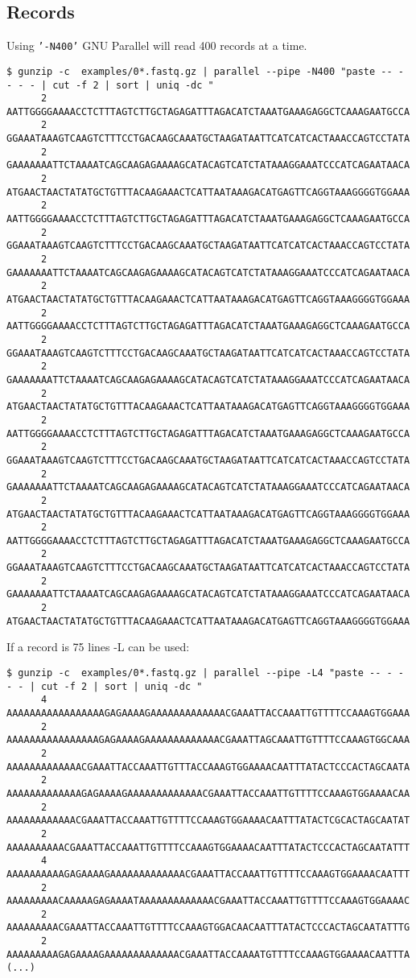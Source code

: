 \documentclass{article}
\newcommand{\cmdoption}[1]{\texttt{'#1'}}
\begin{document}
\subsection{Records}
Using \cmdoption{-N400} GNU Parallel will read 400 records at a time.\\
\begin{lstlisting}
$ gunzip -c  examples/0*.fastq.gz | parallel --pipe -N400 "paste -- - - - - | cut -f 2 | sort | uniq -dc " 
      2 AATTGGGGAAAACCTCTTTAGTCTTGCTAGAGATTTAGACATCTAAATGAAAGAGGCTCAAAGAATGCCA
      2 GGAAATAAAGTCAAGTCTTTCCTGACAAGCAAATGCTAAGATAATTCATCATCACTAAACCAGTCCTATA
      2 GAAAAAAATTCTAAAATCAGCAAGAGAAAAGCATACAGTCATCTATAAAGGAAATCCCATCAGAATAACA
      2 ATGAACTAACTATATGCTGTTTACAAGAAACTCATTAATAAAGACATGAGTTCAGGTAAAGGGGTGGAAA
      2 AATTGGGGAAAACCTCTTTAGTCTTGCTAGAGATTTAGACATCTAAATGAAAGAGGCTCAAAGAATGCCA
      2 GGAAATAAAGTCAAGTCTTTCCTGACAAGCAAATGCTAAGATAATTCATCATCACTAAACCAGTCCTATA
      2 GAAAAAAATTCTAAAATCAGCAAGAGAAAAGCATACAGTCATCTATAAAGGAAATCCCATCAGAATAACA
      2 ATGAACTAACTATATGCTGTTTACAAGAAACTCATTAATAAAGACATGAGTTCAGGTAAAGGGGTGGAAA
      2 AATTGGGGAAAACCTCTTTAGTCTTGCTAGAGATTTAGACATCTAAATGAAAGAGGCTCAAAGAATGCCA
      2 GGAAATAAAGTCAAGTCTTTCCTGACAAGCAAATGCTAAGATAATTCATCATCACTAAACCAGTCCTATA
      2 GAAAAAAATTCTAAAATCAGCAAGAGAAAAGCATACAGTCATCTATAAAGGAAATCCCATCAGAATAACA
      2 ATGAACTAACTATATGCTGTTTACAAGAAACTCATTAATAAAGACATGAGTTCAGGTAAAGGGGTGGAAA
      2 AATTGGGGAAAACCTCTTTAGTCTTGCTAGAGATTTAGACATCTAAATGAAAGAGGCTCAAAGAATGCCA
      2 GGAAATAAAGTCAAGTCTTTCCTGACAAGCAAATGCTAAGATAATTCATCATCACTAAACCAGTCCTATA
      2 GAAAAAAATTCTAAAATCAGCAAGAGAAAAGCATACAGTCATCTATAAAGGAAATCCCATCAGAATAACA
      2 ATGAACTAACTATATGCTGTTTACAAGAAACTCATTAATAAAGACATGAGTTCAGGTAAAGGGGTGGAAA
      2 AATTGGGGAAAACCTCTTTAGTCTTGCTAGAGATTTAGACATCTAAATGAAAGAGGCTCAAAGAATGCCA
      2 GGAAATAAAGTCAAGTCTTTCCTGACAAGCAAATGCTAAGATAATTCATCATCACTAAACCAGTCCTATA
      2 GAAAAAAATTCTAAAATCAGCAAGAGAAAAGCATACAGTCATCTATAAAGGAAATCCCATCAGAATAACA
      2 ATGAACTAACTATATGCTGTTTACAAGAAACTCATTAATAAAGACATGAGTTCAGGTAAAGGGGTGGAAA
\end{lstlisting}
If a record is 75 lines -L can be used:
\begin{lstlisting}
$ gunzip -c  examples/0*.fastq.gz | parallel --pipe -L4 "paste -- - - - - | cut -f 2 | sort | uniq -dc "
      4 AAAAAAAAAAAAAAAAAGAGAAAAGAAAAAAAAAAAAACGAAATTACCAAATTGTTTTCCAAAGTGGAAA
      2 AAAAAAAAAAAAAAAAGAGAAAAGAAAAAAAAAAAAACGAAATTAGCAAATTGTTTTCCAAAGTGGCAAA
      2 AAAAAAAAAAAAACGAAATTACCAAATTGTTTACCAAAGTGGAAAACAATTTATACTCCCACTAGCAATA
      2 AAAAAAAAAAAAAGAGAAAAGAAAAAAAAAAAAACGAAATTACCAAATTGTTTTCCAAAGTGGAAAACAA
      2 AAAAAAAAAAAACGAAATTACCAAATTGTTTTCCAAAGTGGAAAACAATTTATACTCGCACTAGCAATAT
      2 AAAAAAAAAACGAAATTACCAAATTGTTTTCCAAAGTGGAAAACAATTTATACTCCCACTAGCAATATTT
      4 AAAAAAAAAAGAGAAAAGAAAAAAAAAAAAACGAAATTACCAAATTGTTTTCCAAAGTGGAAAACAATTT
      2 AAAAAAAAACAAAAAGAGAAAATAAAAAAAAAAAAACGAAATTACCAAATTGTTTTCCAAAGTGGAAAAC
      2 AAAAAAAAACGAAATTACCAAATTGTTTTCCAAAGTGGACAACAATTTATACTCCCACTAGCAATATTTG
      2 AAAAAAAAAGAGAAAAGAAAAAAAAAAAAACGAAATTACCAAAATGTTTTCCAAAGTGGAAAACAATTTA
(...)
\end{lstlisting}
\end{document}

